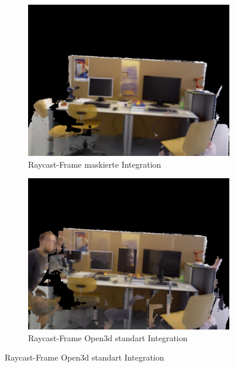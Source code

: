 \documentclass[12pt,DIV=15,BCOR=15mm,twoside,headsepline,abstract=true,listof=totoc,bibliography=totoc]{scrreprt}
\theoremstyle{remark}    %
\begin{document}
    \begin{figure}[ht]
        \centering
        \begin{subfigure}[t]{0.45\textwidth}
            \centering
            \includegraphics[width=\textwidth]{pics/maskout_image.png}
            \caption{Raycast-Frame maskierte Integration}
            \label{fig:bild1}
        \end{subfigure}
        \hfill
        \begin{subfigure}[t]{0.45\textwidth}
            \centering
            \includegraphics[width=\textwidth]{pics/raw_image.png}
            \caption{Raycast-Frame Open3d standart Integration}
            \label{fig:bild2}
        \end{subfigure}

\end{figure}
\end{document}
